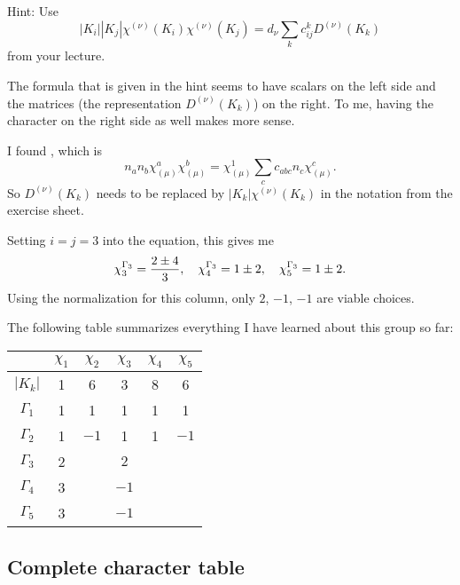 \documentclass[11pt, english, fleqn, DIV=15, headinclude, BCOR=1cm]{scrartcl}
\begin{document}
\begin{problem}
    Hint: Use
    \[
        |K_i| |K_j| \chi^{(\nu)}(K_i) \chi^{(\nu)}(K_j)
        = d_\nu \sum_k c_{ij}^k D^{(\nu)}(K_k)
    \]
    from your lecture.
\end{problem}

The formula that is given in the hint seems to have scalars on the left side
and the matrices (the representation $D^{(\nu)}(K_k)$) on the right. To me,
having the character on the right side as well makes more sense.

I found \parencite[(4.64)]{Luedeling/physics751-notes}, which is
\[
    n_a n_b \chi_{(\mu)}^a \chi_{(\mu)}^b = \chi_{(\mu)}^1 \sum_c c_{abc} n_c
    \chi_{(\mu)}^c.
\]
So $D^{(\nu)}(K_k)$ needs to be replaced by $|K_k| \chi^{(\nu)}(K_k)$ in the
notation from the exercise sheet.

Setting $i = j
= 3$ into the equation, this gives me
\[
    \chi^{\Gamma_3}_3 = \frac{2 \pm 4}{3}
    ,\quad
    \chi^{\Gamma_3}_4 = 1 \pm 2
    ,\quad
    \chi^{\Gamma_3}_5 = 1 \pm 2.
\]
Using the normalization for this column, only $2$, $-1$, $-1$ are viable
choices.

The following table summarizes everything I have learned about this group so
far:

\begin{tabular}{c|ccccc}
    & $\chi_1$ & $\chi_2$ & $\chi_3$ & $\chi_4$ & $\chi_5$ \\
    \midrule
    $|K_k|$ & 1 & 6 & 3 & 8 & 6 \\
    \midrule
    $\Gamma_1$ & 1 & 1 & 1 & 1 & 1 \\
    $\Gamma_2$ & 1 & $-1$ & 1 & 1 & $-1$ \\
    $\Gamma_3$ & 2 & & $2$ & & \\
    $\Gamma_4$ & 3 & & $-1$ & & \\
    $\Gamma_5$ & 3 & & $-1$ & & \\
\end{tabular}

\subsection{Complete character table}
\end{document}
